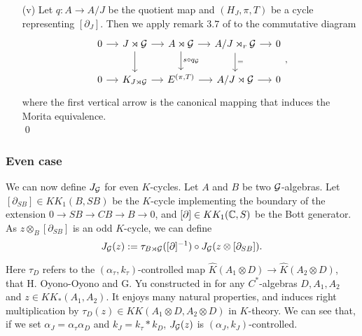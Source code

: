 \begin{dem}
\begin{enumerate}
\item[(v)] Let $q:A\rightarrow A/J$ be the quotient map and $(H_J, \pi, T)$ be a cycle representing $[\partial_J]$. Then we apply remark $3.7$ of \cite{OY2} to the commutative diagram
\[\begin{tikzcd}[column sep = small]
0\arrow{r} & J\rtimes \G\arrow{r}\arrow{d} & A\rtimes \G \arrow{r}\arrow{d}{s\circ q_\G}& A/J\rtimes_r \G\arrow{r}\arrow{d}{=} & 0\\
0\arrow{r} & K_{J\rtimes \G}\arrow{r} & E^{(\pi,T)} \arrow{r}& A/J\rtimes \G\arrow{r} & 0
\end{tikzcd},\]
where the first vertical arrow is the canonical mapping that induces the Morita equivalence. \\
\qed
\end{enumerate}
\end{dem}

\subsubsection{Even case}

We can now define $J_\mathcal G$ for even $K$-cycles. Let $A$ and $B$ be two $\mathcal G$-algebras. Let $[\partial_{SB}]\in KK_1(B,SB)$ be the $K$-cycle implementing the boundary of the extension $0\rightarrow SB\rightarrow CB\rightarrow B\rightarrow 0$, and $[\partial]\in KK_1(\mathbb C,S)$ be the Bott generator. As $z\otimes_B [\partial_{SB}]$ is an odd $K$-cycle, we can define
\[J_\mathcal G(z):= \tau_{B\rtimes \mathcal G}([\partial]^{-1})\circ J_\mathcal G(z\otimes[\partial_{SB}]).\] 

Here $\tau_D$ refers to the $(\alpha_\tau,k_\tau)$-controlled map $\hat K (A_1\otimes D )\rightarrow \hat K(A_2\otimes D)$, that H. Oyono-Oyono and G. Yu constructed in \cite{OY2} for any $C^*$-algebras $D,A_1,A_2$ and $z\in KK_*(A_1,A_2)$. It enjoys many natural properties, and induces right multiplication by $\tau_D(z)\in KK(A_1\otimes D,A_2\otimes D)$ in $K$-theory. We can see that, if we set $\alpha_J=\alpha_\tau \alpha_D$ and $k_J=k_\tau * k_D$, $J_\mathcal G(z)$ is $(\alpha_J,k_J)$-controlled.\\

